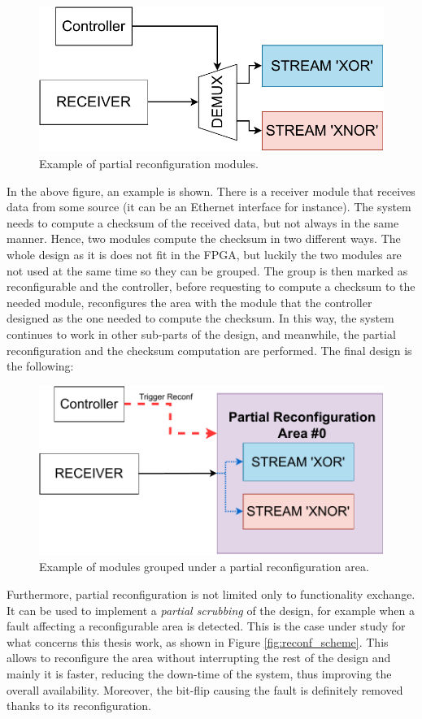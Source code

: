 \begin{figure}[H]
\centering
\includegraphics[width=0.8\linewidth]{images/chapter4/partial_modules.pdf}
\caption{Example of partial reconfiguration modules.}
\label{fig:partial_why}
\end{figure}

In the above figure, an example is shown. There is a receiver module that receives data from some source (it can be an Ethernet interface for instance). The system needs to compute a checksum of the received data, but not always in the same manner. Hence, two modules compute the checksum in two different ways. The whole design as it is does not fit in the FPGA, but luckily the two modules are not used at the same time so they can be grouped. The group is then marked as reconfigurable and the controller, before requesting to compute a checksum to the needed module, reconfigures the area with the module that the controller designed as the one needed to compute the checksum. In this way, the system continues to work in other sub-parts of the design, and meanwhile, the partial reconfiguration and the checksum computation are performed. The final design is the following:

\begin{figure}[H]
\centering
\includegraphics[width=0.8\linewidth]{images/chapter4/partial_modules_group.pdf}
\caption{Example of modules grouped under a partial reconfiguration area.}
\label{fig:partial_why_group}
\end{figure}

Furthermore, partial reconfiguration is not limited only to functionality exchange. It can be used to implement a \textit{partial scrubbing} of the design, for example when a fault affecting a reconfigurable area is detected. This is the case under study for what concerns this thesis work, as shown in Figure \ref{fig:reconf_scheme}. This allows to reconfigure the area without interrupting the rest of the design and mainly it is faster, reducing the down-time of the system, thus improving the overall availability. Moreover, the bit-flip causing the fault is definitely removed thanks to its reconfiguration.\bigskip

